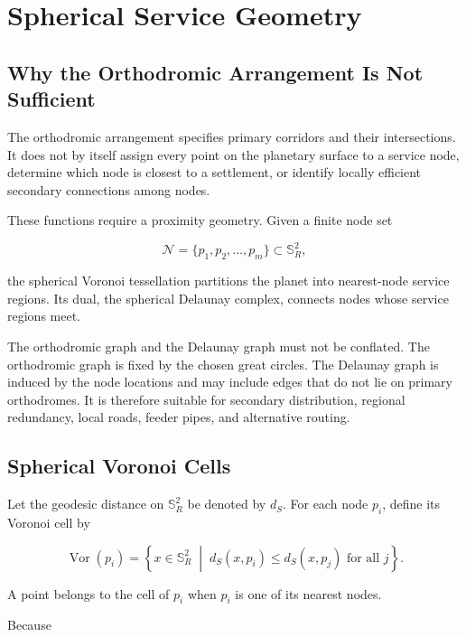 \documentclass[11pt,fleqn]{book}
\numberwithin{equation}{chapter}
\theoremstyle{plain}
\theoremstyle{definition}
\theoremstyle{remark}
\newcommand{\Sphere}{\mathbb{S}^{2}}
\newcommand{\Nset}{\mathcal{N}}
\newcommand{\Vor}{\operatorname{Vor}}
\newcommand{\suchthat}{\;\middle|\;}
\begin{document}
\chapter{Spherical Service Geometry}

\section{Why the Orthodromic Arrangement Is Not Sufficient}

The orthodromic arrangement specifies primary corridors and their intersections. It does not by itself assign every point on the planetary surface to a service node, determine which node is closest to a settlement, or identify locally efficient secondary connections among nodes.

These functions require a proximity geometry. Given a finite node set

\begin{equation}
    \Nset
    =
    \{p_1,p_2,\dots,p_m\}
    \subset\Sphere_R,
\end{equation}

the spherical Voronoi tessellation partitions the planet into nearest-node service regions. Its dual, the spherical Delaunay complex, connects nodes whose service regions meet.

The orthodromic graph and the Delaunay graph must not be conflated. The orthodromic graph is fixed by the chosen great circles. The Delaunay graph is induced by the node locations and may include edges that do not lie on primary orthodromes. It is therefore suitable for secondary distribution, regional redundancy, local roads, feeder pipes, and alternative routing.

\section{Spherical Voronoi Cells}

Let the geodesic distance on \(\Sphere_R\) be denoted by \(d_S\). For each node \(p_i\), define its Voronoi cell by

\begin{equation}
    \Vor(p_i)
    =
    \left\{
    x\in\Sphere_R
    \suchthat
    d_S(x,p_i)
    \leq
    d_S(x,p_j)
    \text{ for all }j
    \right\}.
\end{equation}

A point belongs to the cell of \(p_i\) when \(p_i\) is one of its nearest nodes.

Because
\end{document}
